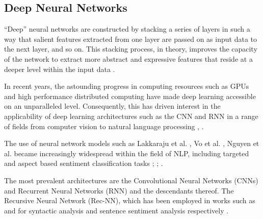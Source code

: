 \documentclass[../../fyp.tex]{subfiles}
\begin{document}
\subsection{Deep Neural Networks}
\enquote{Deep} neural networks are constructed by stacking a series of layers in such a way that salient features extracted from one layer are passed on as input data to the next layer, and so on. This stacking process, in theory, improves the capacity of the network to extract more abstract and expressive features that reside at a deeper level within the input data \cite{zhang2018}.

In recent years, the astounding progress in computing resources such as GPUs and high performance distributed computing have made deep learning accessible on an unparalleled level. Consequently, this has driven interest in the applicability of deep learning architectures such as the CNN and RNN in a range of fields from computer vision to natural language processing \cite{goldberg2015}, \cite{collobert2011}.

The use of neural network models such as Lakkaraju et al. \cite{lakkaraju2014}, Vo et al. \cite{vo2015}, Nguyen et al. \cite{nguyen2015} became increasingly widespread within the field of NLP, including targeted and aspect based sentiment classification tasks \cite{dong}; \cite{wang}; \cite{tang2016} \cite{tang2016b}.

The most prevalent architectures are the Convolutional Neural Networks (CNNs) and Recurrent Neural Networks (RNN) and the descendants thereof. The Recursive Neural Network (Rec-NN), which has been employed in works such as \cite{socher2011} and \cite{socher2013} for syntactic analysis and sentence sentiment analysis respectively \cite{zhang2018}.


\end{document}
